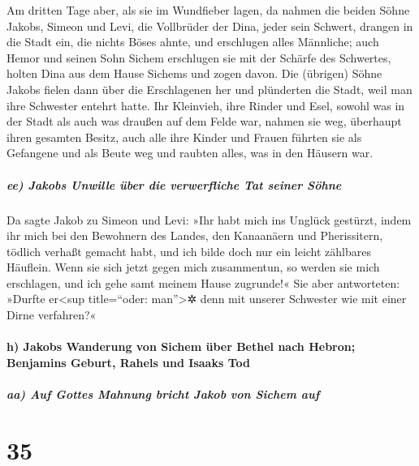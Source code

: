  Am dritten Tage aber, als sie im Wundfieber lagen, da
nahmen die beiden Söhne Jakobs, Simeon und Levi, die Vollbrüder der
Dina, jeder sein Schwert, drangen in die Stadt ein, die nichts Böses
ahnte, und erschlugen alles Männliche;  auch Hemor und
seinen Sohn Sichem erschlugen sie mit der Schärfe des Schwertes, holten
Dina aus dem Hause Sichems und zogen davon.  Die
(übrigen) Söhne Jakobs fielen dann über die Erschlagenen her und
plünderten die Stadt, weil man ihre Schwester entehrt hatte.
 Ihr Kleinvieh, ihre Rinder und Esel, sowohl was in der
Stadt als auch was draußen auf dem Felde war, nahmen sie weg,
 überhaupt ihren gesamten Besitz, auch alle ihre Kinder
und Frauen führten sie als Gefangene und als Beute weg und raubten
alles, was in den Häusern war.

\hypertarget{ee-jakobs-unwille-uxfcber-die-verwerfliche-tat-seiner-suxf6hne}{%
\subparagraph{ee) Jakobs Unwille über die verwerfliche Tat seiner
Söhne}\label{ee-jakobs-unwille-uxfcber-die-verwerfliche-tat-seiner-suxf6hne}}

 Da sagte Jakob zu Simeon und Levi: »Ihr habt mich ins
Unglück gestürzt, indem ihr mich bei den Bewohnern des Landes, den
Kanaanäern und Pherissitern, tödlich verhaßt gemacht habt, und ich bilde
doch nur ein leicht zählbares Häuflein. Wenn sie sich jetzt gegen mich
zusammentun, so werden sie mich erschlagen, und ich gehe samt meinem
Hause zugrunde!«  Sie aber antworteten: »Durfte
er\textless sup title=``oder: man''\textgreater✲ denn mit unserer
Schwester wie mit einer Dirne verfahren?«

\hypertarget{h-jakobs-wanderung-von-sichem-uxfcber-bethel-nach-hebron-benjamins-geburt-rahels-und-isaaks-tod}{%
\paragraph{h) Jakobs Wanderung von Sichem über Bethel nach Hebron;
Benjamins Geburt, Rahels und Isaaks
Tod}\label{h-jakobs-wanderung-von-sichem-uxfcber-bethel-nach-hebron-benjamins-geburt-rahels-und-isaaks-tod}}

\hypertarget{aa-auf-gottes-mahnung-bricht-jakob-von-sichem-auf}{%
\subparagraph{aa) Auf Gottes Mahnung bricht Jakob von Sichem
auf}\label{aa-auf-gottes-mahnung-bricht-jakob-von-sichem-auf}}

\hypertarget{section-34}{%
\section{35}\label{section-34}}


